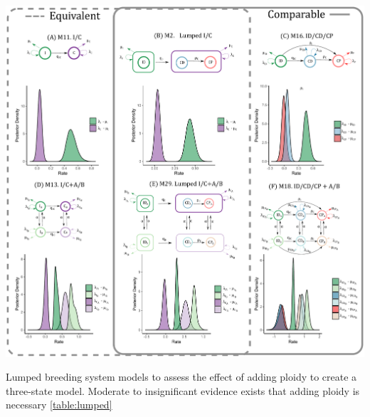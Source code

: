 \begin{suppfigure}
\includegraphics[width=\textwidth]{comparablesIC.pdf}
\caption{Lumped breeding system models to assess the effect of adding ploidy to create a three-state model. Moderate to insignificant evidence exists that adding ploidy is necessary \cref{table:lumped} } %
\label{suppfigure:lumpedIC}
\end{suppfigure}


